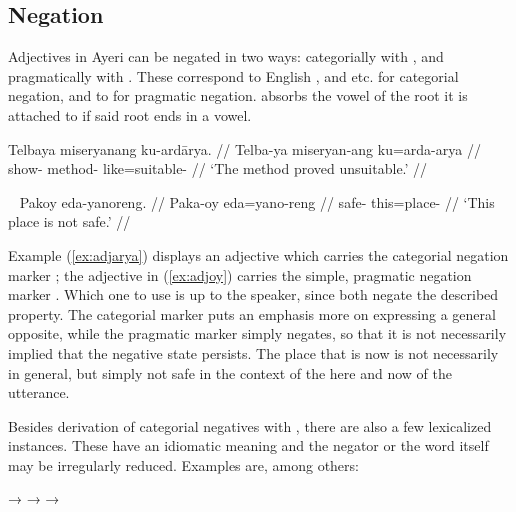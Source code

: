 
\subsection{Negation}

Adjectives in Ayeri can be negated in two ways: categorially with 
, and pragmatically with . These correspond to 
English , and  etc. for categorial negation, and to 
 for pragmatic negation.  absorbs the vowel of the root 
it is attached to if said root ends in a vowel.

\ex\label{ex:adjarya}\begingl
	\gla Telbaya miseryanang ku-ardārya. //
	\glb Telba-ya miseryan-ang ku=arda-arya //
	\glc show-\TsgM{} method-\Aarg{} like=suitable-\Neg{} //
	\glft `The method proved unsuitable.' //
\endgl\xe

\ex~\label{ex:adjoy}\begingl
	\gla Pakoy eda-yanoreng. //
	\glb Paka-oy eda=yano-reng //
	\glc safe-\Neg{} this=place-\AargI{} //
	\glft `This place is not safe.' //
\endgl\xe

Example (\ref{ex:adjarya}) displays an adjective which carries the categorial 
negation marker ; the adjective in (\ref{ex:adjoy}) carries 
the simple, pragmatic negation marker . Which one to use is up 
to the speaker, since both negate the described property. The categorial marker 
puts an emphasis more on expressing a general opposite, while the pragmatic 
marker simply negates, so that it is not necessarily implied that the negative 
state persists. The place that is  now is not 
necessarily  in general, but simply not safe in 
the context of the here and now of the utterance.

Besides  derivation of categorial negatives with , 
there are also a few lexicalized instances. These have an idiomatic meaning and 
the negator or the word itself may be irregularly reduced. Examples are, among 
others:

\pex
	\a {}
		→ 
	\a {}
		→ 
	\a {}
		→ 
\xe


